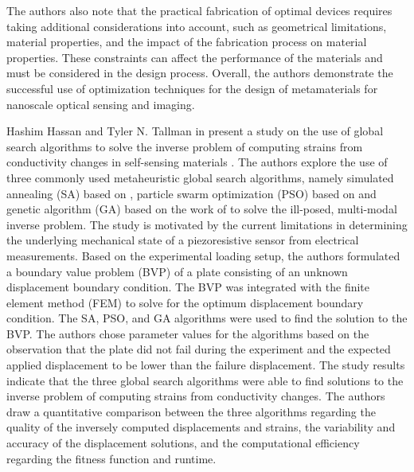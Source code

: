The authors also note that the practical fabrication of optimal devices requires taking additional considerations into account, such as geometrical limitations, material properties, and the impact of the fabrication process on material properties. These constraints can affect the performance of the materials and must be considered in the design process. Overall, the authors demonstrate the successful use of optimization techniques for the design of metamaterials for nanoscale optical sensing and imaging.

Hashim Hassan and Tyler N. Tallman in \cite{hassanComparisonMetaheuristicAlgorithms2021} present a study on the use of global search algorithms to solve the inverse problem of computing strains from conductivity changes in self-sensing materials \cite{Chung2016Self, Rana2016review,SBack,Swait2012Smart,Thostenson2007Multifunctional,Tian2019state,Vlachakis2020Self}. The authors explore the use of three commonly used metaheuristic global search algorithms, namely simulated annealing (SA) based on \cite{ingberAdaptiveSimulatedAnnealing2000, metropolisEquationStateCalculations1953}, particle swarm optimization (PSO) based on \cite{kennedyParticleSwarmOptimization1995, pedersenGoodParametersParticle2010, mezura-montesConstrainthandlingNatureinspiredNumerical2011} and genetic algorithm (GA) based on the work of \cite{raghavanSpectralAnalysisRlines2008, hassanFailurePredictionSelfsensing2020} to solve the ill-posed, multi-modal inverse problem. The study is motivated by the current limitations in determining the underlying mechanical state of a piezoresistive sensor from electrical measurements.
Based on the experimental loading setup, the authors formulated a boundary value problem (BVP) of a plate consisting of an unknown displacement boundary condition. The BVP was integrated with the finite element method (FEM) to solve for the optimum displacement boundary condition. The SA, PSO, and GA algorithms were used to find the solution to the BVP. The authors chose parameter values for the algorithms based on the observation that the plate did not fail during the experiment and the expected applied displacement to be lower than the failure displacement.
The study results indicate that the three global search algorithms were able to find solutions to the inverse problem of computing strains from conductivity changes. The authors draw a quantitative comparison between the three algorithms regarding the quality of the inversely computed displacements and strains, the variability and accuracy of the displacement solutions, and the computational efficiency regarding the fitness function and runtime.

